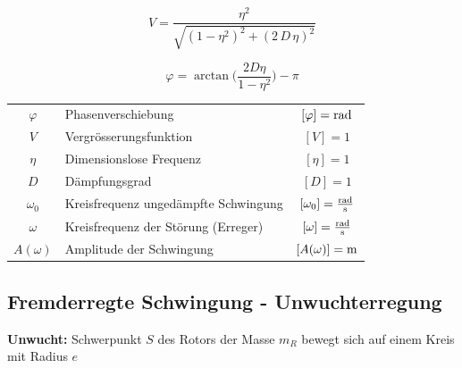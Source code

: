 \begin{minipage}{0.48\linewidth}
$$ \boxed{ V = \frac{\eta^2}{\sqrt{(1- \eta^2)^2 + (2 \, D \, \eta)^2} } } $$
\end{minipage}
\hfill
\begin{minipage}{0.48\linewidth}
$$ \boxed{ \varphi = \arctan \Big( \frac{2 D \eta}{1 - \eta^2} \Big) - \pi } $$ 
\end{minipage}

\vspace{0.2cm}

\begin{tabular}{c l c}
$\varphi$ & Phasenverschiebung & $[ \varphi] = \mathrm{rad}$ \\
$V$ & Vergrösserungsfunktion & $[V] = 1$ \\
$\eta$ & Dimensionslose Frequenz & $[\eta] = 1$  \\
$D$ & Dämpfungsgrad & $[D] = 1$  \\
\rule{0pt}{10pt} $\omega_0$ & Kreisfrequenz ungedämpfte Schwingung & $[\omega_0] = \frac{\mathrm{rad}}{\mathrm{s}}$ \\
\rule{0pt}{10pt} $\omega$ & Kreisfrequenz der Störung (Erreger) & $[\omega] = \frac{\mathrm{rad}}{\mathrm{s}}$ \\
$A(\omega)$ & Amplitude der Schwingung & $[A(\omega)] = \mathrm{m}$
\end{tabular}



\subsection{Fremderregte Schwingung - Unwuchterregung}
\textbf{Unwucht:} Schwerpunkt $S$ des Rotors der Masse $m_R$ bewegt sich auf einem Kreis mit Radius $e$ \\

